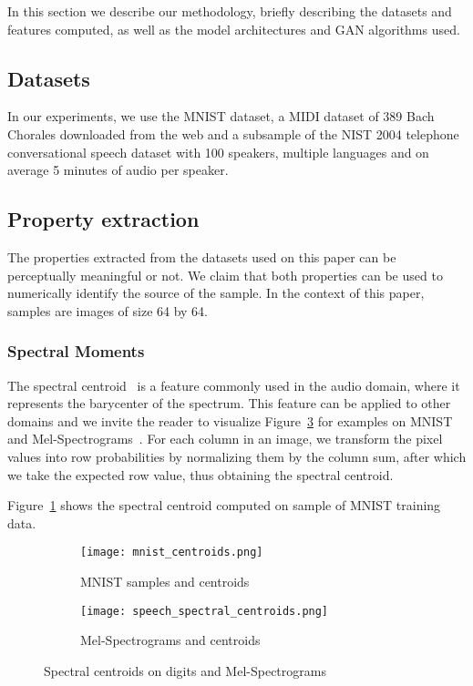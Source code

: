In this section we describe our methodology, 
briefly describing the datasets and features computed, as well as the model
architectures and GAN algorithms used.
\subsection{Datasets}
In our experiments, we use the MNIST dataset, a MIDI dataset of 389 Bach
Chorales downloaded from the web and a subsample of the NIST 2004 telephone
conversational speech dataset with 100 speakers, multiple languages and
on average 5 minutes of audio per speaker.

\subsection{Property extraction}
The properties extracted from the datasets used on this paper can be
perceptually meaningful or not. We claim that both properties can be used to numerically identify the source of the sample. In the context of this
paper, samples are images of size 64 by 64. 

\subsubsection{Spectral Moments}
The spectral centroid~\cite{peeters2004large} is a feature commonly used in the
audio domain, where it represents the barycenter of the spectrum. This feature
can be applied to other domains and we invite the reader to visualize 
Figure~\ref{fig:centroids} for examples on MNIST and
Mel-Spectrograms~\cite{peeters2004large}. For each column in an image, we 
transform the pixel values into row probabilities by normalizing them by the
column sum, after which we take the expected row value, thus obtaining the
spectral centroid.

Figure~\ref{fig:mnist_centroids} shows the spectral centroid computed
on sample of MNIST training data.

\begin{figure}[!h]
    \centering
    \begin{subfigure}[b]{0.4\textwidth}
        \texttt{[image: mnist\_centroids.png]}
        \caption{MNIST samples and centroids}
        \label{fig:mnist_centroids}
    \end{subfigure}
    \quad
    \begin{subfigure}[b]{0.4\textwidth}
        \texttt{[image: speech\_spectral\_centroids.png]}
        \caption{Mel-Spectrograms and centroids}
        \label{fig:spectrogram_centroids}
    \end{subfigure}
    \caption{Spectral centroids on digits and Mel-Spectrograms}
    \label{fig:centroids}
\end{figure}

